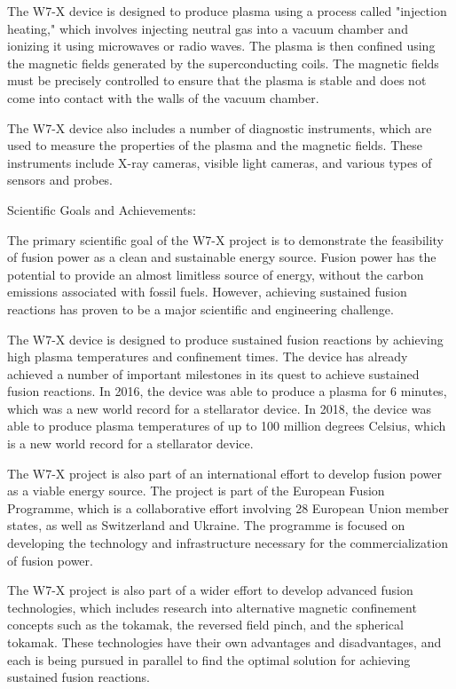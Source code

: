 \documentclass[12pt]{article}
\begin{document}
The W7-X device is designed to produce plasma using a process called "injection heating," which involves injecting neutral gas into a vacuum chamber and ionizing it using microwaves or radio waves. The plasma is then confined using the magnetic fields generated by the superconducting coils. The magnetic fields must be precisely controlled to ensure that the plasma is stable and does not come into contact with the walls of the vacuum chamber.

The W7-X device also includes a number of diagnostic instruments, which are used to measure the properties of the plasma and the magnetic fields. These instruments include X-ray cameras, visible light cameras, and various types of sensors and probes.

Scientific Goals and Achievements:

The primary scientific goal of the W7-X project is to demonstrate the feasibility of fusion power as a clean and sustainable energy source. Fusion power has the potential to provide an almost limitless source of energy, without the carbon emissions associated with fossil fuels. However, achieving sustained fusion reactions has proven to be a major scientific and engineering challenge.

The W7-X device is designed to produce sustained fusion reactions by achieving high plasma temperatures and confinement times. The device has already achieved a number of important milestones in its quest to achieve sustained fusion reactions. In 2016, the device was able to produce a plasma for 6 minutes, which was a new world record for a stellarator device. In 2018, the device was able to produce plasma temperatures of up to 100 million degrees Celsius, which is a new world record for a stellarator device.

The W7-X project is also part of an international effort to develop fusion power as a viable energy source. The project is part of the European Fusion Programme, which is a collaborative effort involving 28 European Union member states, as well as Switzerland and Ukraine. The programme is focused on developing the technology and infrastructure necessary for the commercialization of fusion power.

The W7-X project is also part of a wider effort to develop advanced fusion technologies, which includes research into alternative magnetic confinement concepts such as the tokamak, the reversed field pinch, and the spherical tokamak. These technologies have their own advantages and disadvantages, and each is being pursued in parallel to find the optimal solution for achieving sustained fusion reactions.
\end{document}

